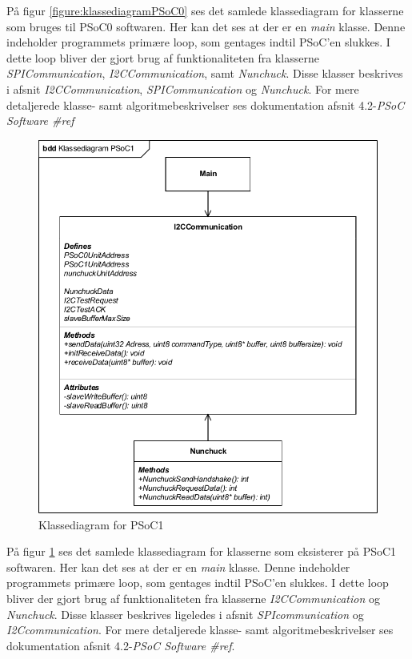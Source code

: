 \noindent På figur \ref{figure:klassediagramPSoC0} ses det samlede klassediagram for klasserne som bruges til PSoC0 softwaren. Her kan det ses at der er en \textit{main} klasse. Denne indeholder programmets primære loop, som gentages indtil PSoC'en slukkes. I dette loop bliver der gjort brug af funktionaliteten fra klasserne \textit{SPICommunication}, \textit{I2CCommunication}, samt \textit{Nunchuck}. Disse klasser beskrives i afsnit \textit{I2CCommunication}, \textit{SPICommunication} og \textit{Nunchuck}. For mere detaljerede klasse- samt algoritmebeskrivelser ses dokumentation afsnit 4.2-\textit{PSoC Software \#ref}

\begin{figure}[H]
	\centering
	\includegraphics[width=\textwidth]{DesignOgImplementering/images/PSoC1KlassediagramOversigt.pdf}
	\caption{Klassediagram for PSoC1}
	\label{figure:klassediagramPSoC1}
\end{figure}

\noindent På figur \ref{figure:klassediagramPSoC1} ses det samlede klassediagram for klasserne som eksisterer på PSoC1 softwaren. Her kan det ses at der er en \textit{main} klasse. Denne indeholder programmets primære loop, som gentages indtil PSoC'en slukkes. I dette loop bliver der gjort brug af funktionaliteten fra klasserne \textit{I2CCommunication} og \textit{Nunchuck}. Disse klasser beskrives ligeledes i afsnit \textit{SPIcommunication} og \textit{I2Ccommunication}. For mere detaljerede klasse- samt algoritmebeskrivelser ses dokumentation afsnit 4.2-\textit{PSoC Software \#ref}.

